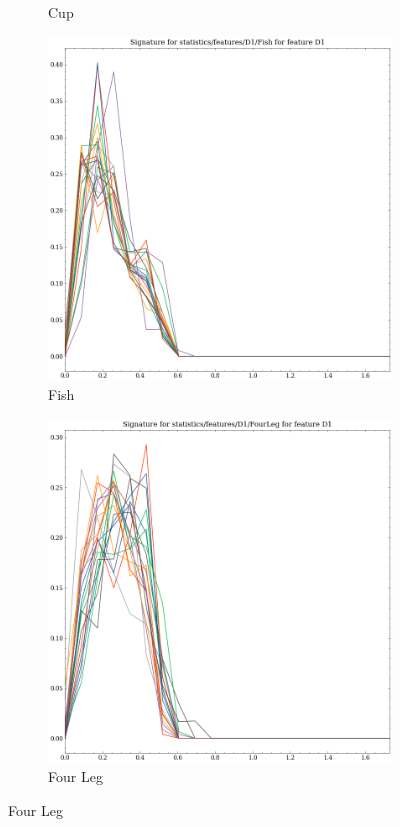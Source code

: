 \begin{figure}[t!p]
\begin{subfigure}[b]{0.23\textwidth}
        \caption{Cup}
        \label{fig:features-statistics-D1-j}    
    \end{subfigure}
    \hfill
    \begin{subfigure}[b]{0.23\textwidth}
        \includegraphics[width=\textwidth]{assets/feature_extraction/D1/Fish.png}
        \caption{Fish}
        \label{fig:features-statistics-D1-k}    
    \end{subfigure}
    \hfill
    \begin{subfigure}[b]{0.23\textwidth}
        \includegraphics[width=\textwidth]{assets/feature_extraction/D1/FourLeg.png}
        \caption{Four Leg}
        \label{fig:features-statistics-D1-l}    
    \end{subfigure}
    \hfill


\end{figure}
